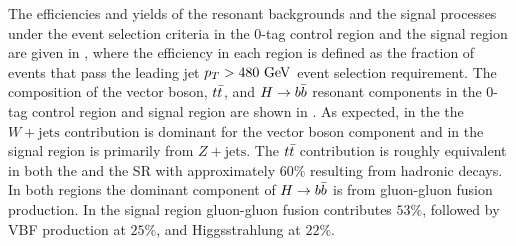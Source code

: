 The efficiencies and yields of the resonant backgrounds and the signal processes under the event selection criteria in the $0$-tag control region and the signal region are given in , where the efficiency in each region is defined as the fraction of events that pass the leading \largeR{} jet $p_{T} > 480~\mathrm{GeV}$ event selection requirement.
The composition of the vector boson, $t\bar{t}$, and $H \to b\bar{b}$ resonant components in the $0$-tag control region and signal region are shown in .
As expected, in the \CRQCD{} the $W+\mathrm{jets}$ contribution is dominant for the vector boson component and in the signal region is primarily from $Z+\mathrm{jets}$.
The $t\bar{t}$ contribution is roughly equivalent in both the \CRQCD{} and the SR with approximately $60\%$ resulting from hadronic decays.
In both regions the dominant component of $H \to b\bar{b}$ is from gluon-gluon fusion production.
In the signal region gluon-gluon fusion contributes $53\%$, followed by VBF production at $25\%$, and Higgsstrahlung at $22\%$.

